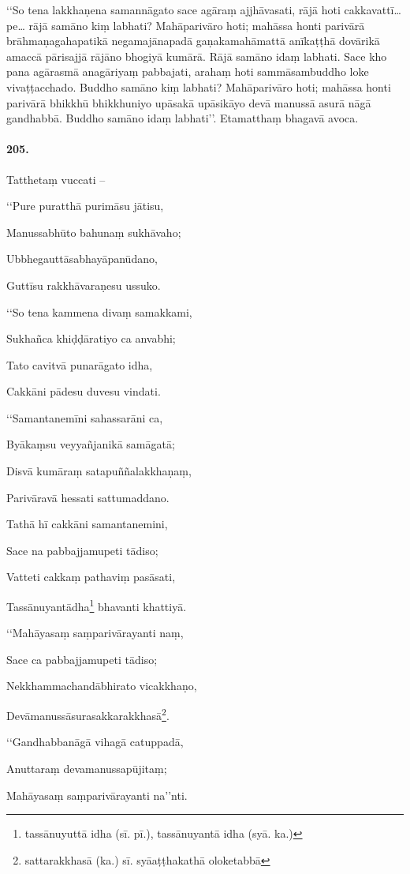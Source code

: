 ‘‘So tena lakkhaṇena samannāgato sace agāraṃ ajjhāvasati, rājā hoti cakkavattī…pe… rājā samāno kiṃ labhati? Mahāparivāro hoti; mahāssa honti parivārā brāhmaṇagahapatikā negamajānapadā gaṇakamahāmattā anīkaṭṭhā dovārikā amaccā pārisajjā rājāno bhogiyā kumārā. Rājā samāno idaṃ labhati. Sace kho pana agārasmā anagāriyaṃ pabbajati, arahaṃ hoti sammāsambuddho loke vivaṭṭacchado. Buddho samāno kiṃ labhati? Mahāparivāro hoti; mahāssa honti parivārā bhikkhū bhikkhuniyo upāsakā upāsikāyo devā manussā asurā nāgā gandhabbā. Buddho samāno idaṃ labhati’’. Etamatthaṃ bhagavā avoca.

\paragraph{205.} Tatthetaṃ vuccati –

‘‘Pure puratthā purimāsu jātisu,

Manussabhūto bahunaṃ sukhāvaho;

Ubbhegauttāsabhayāpanūdano,

Guttīsu rakkhāvaraṇesu ussuko.

‘‘So tena kammena divaṃ samakkami,

Sukhañca khiḍḍāratiyo ca anvabhi;

Tato cavitvā punarāgato idha,

Cakkāni pādesu duvesu vindati.

‘‘Samantanemīni sahassarāni ca,

Byākaṃsu veyyañjanikā samāgatā;

Disvā kumāraṃ satapuññalakkhaṇaṃ,

Parivāravā hessati sattumaddano.

Tathā hī cakkāni samantanemini,

Sace na pabbajjamupeti tādiso;

Vatteti cakkaṃ pathaviṃ pasāsati,

Tassānuyantādha\footnote{tassānuyuttā idha (sī. pī.), tassānuyantā idha (syā. ka.)} bhavanti khattiyā.

‘‘Mahāyasaṃ saṃparivārayanti naṃ,

Sace ca pabbajjamupeti tādiso;

Nekkhammachandābhirato vicakkhaṇo,

Devāmanussāsurasakkarakkhasā\footnote{sattarakkhasā (ka.) sī. syāaṭṭhakathā oloketabbā}.

‘‘Gandhabbanāgā vihagā catuppadā,

Anuttaraṃ devamanussapūjitaṃ;

Mahāyasaṃ saṃparivārayanti na’’nti.

